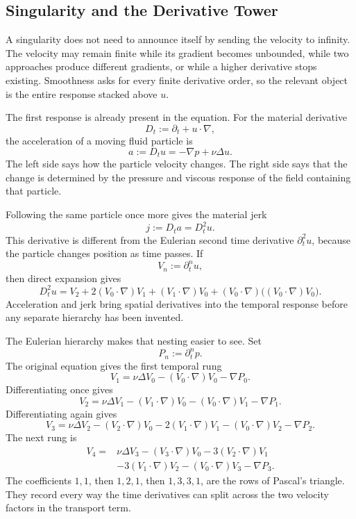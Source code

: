 \subsection{Singularity and the Derivative Tower}\label{sub:SingularityAndTheDerivativeTower}

A singularity does not need to announce itself by sending the velocity to infinity.
The velocity may remain finite while its gradient becomes unbounded, while two approaches produce different gradients, or while a higher derivative stops existing.
Smoothness asks for every finite derivative order, so the relevant object is the entire response stacked above \(u\).


The first response is already present in the equation.
For the material derivative
\[
  D_t:=\partial_t+u\cdot\nabla,
\]
the acceleration of a moving fluid particle is
\[
  a:=D_tu=-\nabla p+\nu\Delta u.
\]
The left side says how the particle velocity changes.
The right side says that the change is determined by the pressure and viscous response of the field containing that particle.

Following the same particle once more gives the material jerk
\[
  j:=D_ta=D_t^2u.
\]
This derivative is different from the Eulerian second time derivative \(\partial_t^2u\), because the particle changes position as time passes.
If
\[
  V_n:=\partial_t^n u,
\]
then direct expansion gives
\[
  D_t^2u
  =
  V_2
  +2(V_0\cdot\nabla)V_1
  +(V_1\cdot\nabla)V_0
  +(V_0\cdot\nabla)\bigl((V_0\cdot\nabla)V_0\bigr).
\]
Acceleration and jerk bring spatial derivatives into the temporal response before any separate hierarchy has been invented.

The Eulerian hierarchy makes that nesting easier to see.
Set
\[
  P_n:=\partial_t^n p.
\]
The original equation gives the first temporal rung
\[
  V_1
  =
  \nu\Delta V_0
  -(V_0\cdot\nabla)V_0
  -\nabla P_0.
\]
Differentiating once gives
\[
  V_2
  =
  \nu\Delta V_1
  -(V_1\cdot\nabla)V_0
  -(V_0\cdot\nabla)V_1
  -\nabla P_1.
\]
Differentiating again gives
\[
  V_3
  =
  \nu\Delta V_2
  -(V_2\cdot\nabla)V_0
  -2(V_1\cdot\nabla)V_1
  -(V_0\cdot\nabla)V_2
  -\nabla P_2.
\]
The next rung is
\[
  \begin{aligned}
  V_4
  ={}&
  \nu\Delta V_3
  -(V_3\cdot\nabla)V_0
  -3(V_2\cdot\nabla)V_1\\
  &-3(V_1\cdot\nabla)V_2
  -(V_0\cdot\nabla)V_3
  -\nabla P_3.
  \end{aligned}
\]
The coefficients \(1,1\), then \(1,2,1\), then \(1,3,3,1\), are the rows of Pascal's triangle.
They record every way the time derivatives can split across the two velocity factors in the transport term.

